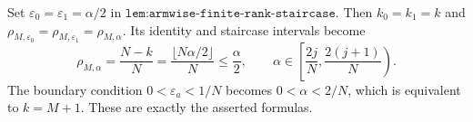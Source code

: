 Set \(\varepsilon_0=\varepsilon_1=\alpha/2\) in \(\texttt{lem:armwise-finite-rank-staircase}\). Then \(k_0=k_1=k\) and \(\rho_{M,\varepsilon_0}=\rho_{M,\varepsilon_1}=\rho_{M,\alpha}\). Its identity and staircase intervals become
\[
\rho_{M,\alpha}=\frac{N-k}{N}=\frac{\lfloor N\alpha/2\rfloor}{N}\le\frac\alpha2,
\qquad
\alpha\in\left[\frac{2j}{N},\frac{2(j+1)}{N}\right).
\]
The boundary condition \(0<\varepsilon_a<1/N\) becomes \(0<\alpha<2/N\), which is equivalent to \(k=M+1\). These are exactly the asserted formulas.